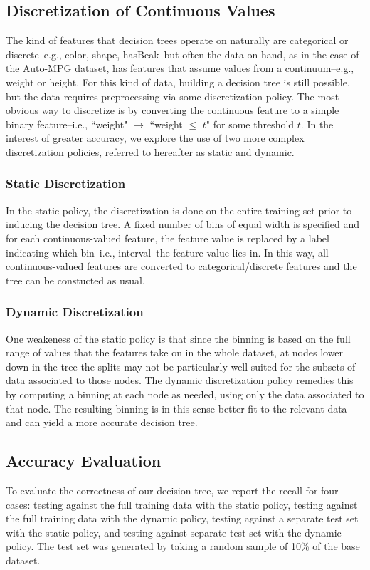 \documentclass[12pt, conference, compsocconf]{IEEEtran}
\begin{document}
\subsection{Discretization of Continuous Values}
The kind of features that decision trees operate on naturally are categorical or discrete--e.g., color, shape, hasBeak--but often the data on hand, as in the case of the Auto-MPG dataset, has features that assume values from a continuum--e.g., weight or height.
For this kind of data, building a decision tree is still possible, but the data requires preprocessing via some discretization policy. 
The most obvious way to discretize is by converting the continuous feature to a simple binary feature--i.e., ``weight" $\rightarrow$ ``weight $\leq$ $t$" for some threshold $t$. 
In the interest of greater accuracy, we explore the use of two more complex discretization policies, referred to hereafter as static and dynamic.

\subsubsection{Static Discretization}
In the static policy, the discretization is done on the entire training set prior to inducing the decision tree. 
A fixed number of bins of equal width is specified and for each continuous-valued feature, the feature value is replaced by a label indicating which bin--i.e., interval--the feature value lies in. 
In this way, all continuous-valued features are converted to categorical/discrete features and the tree can be constucted as usual. 

\subsubsection{Dynamic Discretization}
One weakeness of the static policy is that since the binning is based on the full range of values that the features take on in the whole dataset, at nodes lower down in the tree the splits may not be particularly well-suited for the subsets of data associated to those nodes. 
The dynamic discretization policy remedies this by computing a binning at each node as needed, using only the data associated to that node. 
The resulting binning is in this sense better-fit to the relevant data and can yield a more accurate decision tree. 

\subsection{Accuracy Evaluation}
To evaluate the correctness of our decision tree, we report the recall for four cases: testing against the full training data with the static policy, testing against the full training data with the dynamic policy, testing against a separate test set with the static policy, and testing against separate test set with the dynamic policy. 
The test set was generated by taking a random sample of 10\% of the base dataset. 
\end{document}
